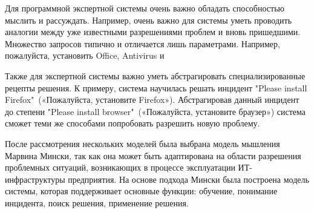 Для программной экспертной системы очень важно обладать способностью мыслить и рассуждать. Например, очень важно для системы уметь проводить аналогии между уже известными разрешениями проблем и вновь пришедшими. Множество запросов типично и отличается лишь параметрами. Например, пожалуйста, установить Office, Antivirus и \etc\ \par
Также для экспертной системы важно уметь абстрагировать специализированные рецепты решения. К примеру, система научилась решать инцидент "Please install Firefox"\ («Пожалуйста, установите Firefox»). Абстрагировав данный инцидент до степени "Please install browser"\  («Пожалуйста, установите браузер») система сможет теми же способами попробовать разрешить новую проблему.\par
После рассмотрения нескольких моделей была выбрана модель мышления Марвина Мински, так как она может быть адаптирована на области разрешения проблемных ситуаций, возникающих в процессе эксплуатации ИТ-инфраструктуры предприятия. На основе подхода Мински была построена модель системы, которая поддерживает основные функции: обучение, понимание инцидента, поиск решения, применение решения. 

\clearpage

